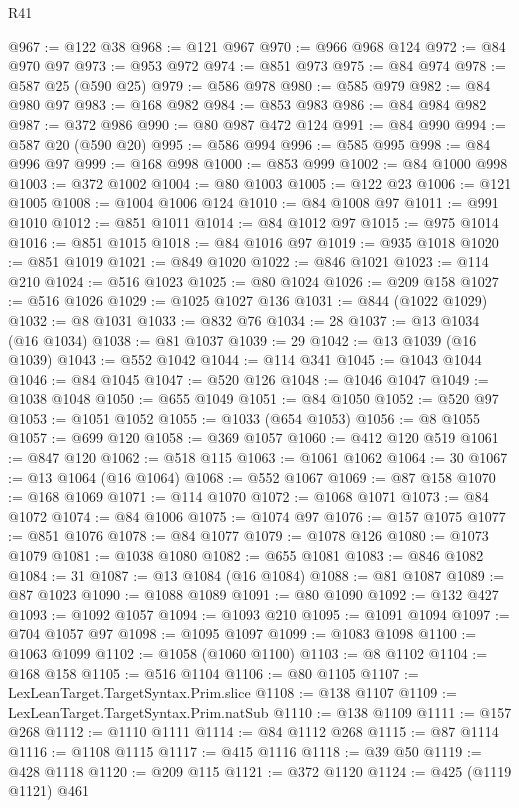 \begin{lexlean}{R41}
\begin{coremodule}
{{{{{{{{{{{{{{{{{{{{{{{{{{{{{{{{{{{{{{{{{{{{{{{{{{{{{{{{{{{{{{{{{{{{{{{{{{{{{{{{{{{{{{{@967 := @122 @38
@968 := @121 @967
@970 := @966 @968 @124
@972 := @84 @970 @97
@973 := @953 @972
@974 := @851 @973
@975 := @84 @974
@978 := @587 @25 (@590 @25)
@979 := @586 @978
@980 := @585 @979
@982 := @84 @980 @97
@983 := @168 @982
@984 := @853 @983
@986 := @84 @984 @982
@987 := @372 @986
@990 := @80 @987 @472 @124
@991 := @84 @990
@994 := @587 @20 (@590 @20)
@995 := @586 @994
@996 := @585 @995
@998 := @84 @996 @97
@999 := @168 @998
@1000 := @853 @999
@1002 := @84 @1000 @998
@1003 := @372 @1002
@1004 := @80 @1003
@1005 := @122 @23
@1006 := @121 @1005
@1008 := @1004 @1006 @124
@1010 := @84 @1008 @97
@1011 := @991 @1010
@1012 := @851 @1011
@1014 := @84 @1012 @97
@1015 := @975 @1014
@1016 := @851 @1015
@1018 := @84 @1016 @97
@1019 := @935 @1018
@1020 := @851 @1019
@1021 := @849 @1020
@1022 := @846 @1021
@1023 := @114 @210
@1024 := @516 @1023
@1025 := @80 @1024
@1026 := @209 @158
@1027 := @516 @1026
@1029 := @1025 @1027 @136
@1031 := @844 (@1022 @1029)
@1032 := @8 @1031
@1033 := @832 @76
@1034 := 28
@1037 := @13 @1034 (@16 @1034)
@1038 := @81 @1037
@1039 := 29
@1042 := @13 @1039 (@16 @1039)
@1043 := @552 @1042
@1044 := @114 @341
@1045 := @1043 @1044
@1046 := @84 @1045
@1047 := @520 @126
@1048 := @1046 @1047
@1049 := @1038 @1048
@1050 := @655 @1049
@1051 := @84 @1050
@1052 := @520 @97
@1053 := @1051 @1052
@1055 := @1033 (@654 @1053)
@1056 := @8 @1055
@1057 := @699 @120
@1058 := @369 @1057
@1060 := @412 @120 @519
@1061 := @847 @120
@1062 := @518 @115
@1063 := @1061 @1062
@1064 := 30
@1067 := @13 @1064 (@16 @1064)
@1068 := @552 @1067
@1069 := @87 @158
@1070 := @168 @1069
@1071 := @114 @1070
@1072 := @1068 @1071
@1073 := @84 @1072
@1074 := @84 @1006
@1075 := @1074 @97
@1076 := @157 @1075
@1077 := @851 @1076
@1078 := @84 @1077
@1079 := @1078 @126
@1080 := @1073 @1079
@1081 := @1038 @1080
@1082 := @655 @1081
@1083 := @846 @1082
@1084 := 31
@1087 := @13 @1084 (@16 @1084)
@1088 := @81 @1087
@1089 := @87 @1023
@1090 := @1088 @1089
@1091 := @80 @1090
@1092 := @132 @427
@1093 := @1092 @1057
@1094 := @1093 @210
@1095 := @1091 @1094
@1097 := @704 @1057 @97
@1098 := @1095 @1097
@1099 := @1083 @1098
@1100 := @1063 @1099
@1102 := @1058 (@1060 @1100)
@1103 := @8 @1102
@1104 := @168 @158
@1105 := @516 @1104
@1106 := @80 @1105
@1107 := LexLeanTarget.TargetSyntax.Prim.slice
@1108 := @138 @1107
@1109 := LexLeanTarget.TargetSyntax.Prim.natSub
@1110 := @138 @1109
@1111 := @157 @268
@1112 := @1110 @1111
@1114 := @84 @1112 @268
@1115 := @87 @1114
@1116 := @1108 @1115
@1117 := @415 @1116
@1118 := @39 @50
@1119 := @428 @1118
@1120 := @209 @115
@1121 := @372 @1120
@1124 := @425 (@1119 @1121) @461
}}}}}}}}}}}}}}}}}}}}}}}}}}}}}}}}}}}}}}}}}}}}}}}}}}}}}}}}}}}}}}}}}}}}}}}}}}}}}}}}}}}}}}}
\end{coremodule}
\end{lexlean}
